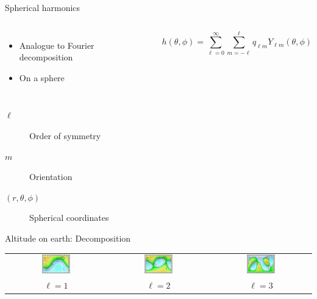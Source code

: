 \begin{frame}{Spherical harmonics}
	\begin{columns}
	\begin{itemize}
		\item Analogue to Fourier decomposition
		\item On a sphere
	\end{itemize}
	\[ h(\theta,\phi) = \sum_{\ell=0}^{\infty} \sum_{m=-\ell}^{\ell} q_{\ell m} Y_{\ell m}(\theta,\phi) \]
	\end{columns}
	\begin{description}
		\item[$\ell$] Order of symmetry
		\item[$m$] Orientation
		\item[$(r,\theta,\phi)$] Spherical coordinates
	\end{description}
	\begin{center}Altitude on earth: Decomposition\end{center}
	\begin{tabular}{ccc}
	\includegraphics[width=0.3\textwidth]{earth_l1} & \includegraphics[width=0.3\textwidth]{earth_l2} & \includegraphics[width=0.3\textwidth]{earth_l3} \\ 
	$\ell=1$ & $\ell=2$ & $\ell=3$ \\ 
	\end{tabular} 
\end{frame}


